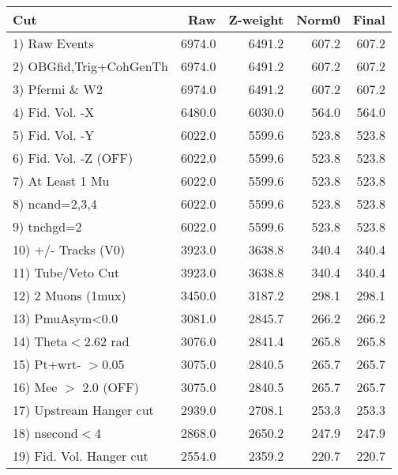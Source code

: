  \begin{table}[h!]\centering
 \begin{tabular}{||l||r|r|r|r||}
 \hline
 \hline
 Cut & Raw & Z-weight & Norm0 & Final \\
 \hline
  1) Raw Events           &      6974.0 &      6491.2 &       607.2 &       607.2 \\
  2) OBGfid,Trig+CohGenTh &      6974.0 &      6491.2 &       607.2 &       607.2 \\
  3) Pfermi \& W2         &      6974.0 &      6491.2 &       607.2 &       607.2 \\
  4) Fid. Vol. -X         &      6480.0 &      6030.0 &       564.0 &       564.0 \\
  5) Fid. Vol. -Y         &      6022.0 &      5599.6 &       523.8 &       523.8 \\
  6) Fid. Vol. -Z (OFF)   &      6022.0 &      5599.6 &       523.8 &       523.8 \\
  7) At Least 1 Mu        &      6022.0 &      5599.6 &       523.8 &       523.8 \\
  8) ncand=2,3,4          &      6022.0 &      5599.6 &       523.8 &       523.8 \\
  9) tnchgd=2             &      6022.0 &      5599.6 &       523.8 &       523.8 \\
 10) +/- Tracks (V0)      &      3923.0 &      3638.8 &       340.4 &       340.4 \\
 11) Tube/Veto Cut        &      3923.0 &      3638.8 &       340.4 &       340.4 \\
 12) 2 Muons (1mux)       &      3450.0 &      3187.2 &       298.1 &       298.1 \\
 13) PmuAsym<0.0          &      3081.0 &      2845.7 &       266.2 &       266.2 \\
 14) Theta$<$2.62 rad     &      3076.0 &      2841.4 &       265.8 &       265.8 \\
 15) Pt+wrt- $>$0.05      &      3075.0 &      2840.5 &       265.7 &       265.7 \\
 16) Mee $>$ 2.0  (OFF)   &      3075.0 &      2840.5 &       265.7 &       265.7 \\
 17) Upstream Hanger cut  &      2939.0 &      2708.1 &       253.3 &       253.3 \\
 18) nsecond$<$4          &      2868.0 &      2650.2 &       247.9 &       247.9 \\
 19) Fid. Vol. Hanger cut &      2554.0 &      2359.2 &       220.7 &       220.7 \\

\end{tabular}
\end{table}
